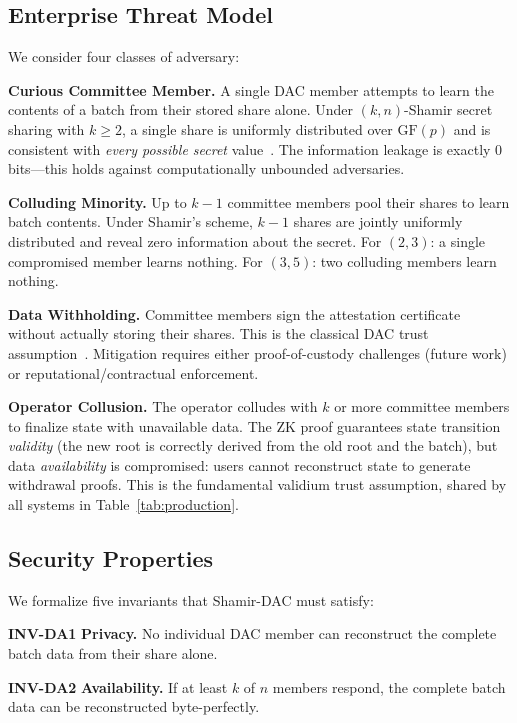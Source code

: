 \subsection{Enterprise Threat Model}

We consider four classes of adversary:

\textbf{Curious Committee Member.} A single DAC member attempts to learn
the contents of a batch from their stored share alone. Under $(k,n)$-Shamir
secret sharing with $k \geq 2$, a single share is uniformly distributed over
$\mathrm{GF}(p)$ and is consistent with \emph{every possible secret}
value~\cite{shamir1979share}. The information leakage is exactly 0 bits---this
holds against computationally unbounded adversaries.

\textbf{Colluding Minority.} Up to $k-1$ committee members pool their shares
to learn batch contents. Under Shamir's scheme, $k-1$ shares are jointly
uniformly distributed and reveal zero information about the secret. For
$(2,3)$: a single compromised member learns nothing. For $(3,5)$: two
colluding members learn nothing.

\textbf{Data Withholding.} Committee members sign the attestation certificate
without actually storing their shares. This is the classical DAC trust
assumption~\cite{ethereum2024validium}. Mitigation requires either
proof-of-custody challenges (future work) or reputational/contractual
enforcement.

\textbf{Operator Collusion.} The operator colludes with $k$ or more committee
members to finalize state with unavailable data. The ZK proof guarantees state
transition \emph{validity} (the new root is correctly derived from the old
root and the batch), but data \emph{availability} is compromised: users cannot
reconstruct state to generate withdrawal proofs. This is the fundamental
validium trust assumption, shared by all systems in Table~\ref{tab:production}.

\subsection{Security Properties}

We formalize five invariants that Shamir-DAC must satisfy:

\noindent\textbf{INV-DA1} \textbf{Privacy.} No individual DAC member can
reconstruct the complete batch data from their share alone.

\smallskip\noindent\textbf{INV-DA2} \textbf{Availability.} If at least $k$ of $n$ members
respond, the complete batch data can be reconstructed byte-perfectly.

